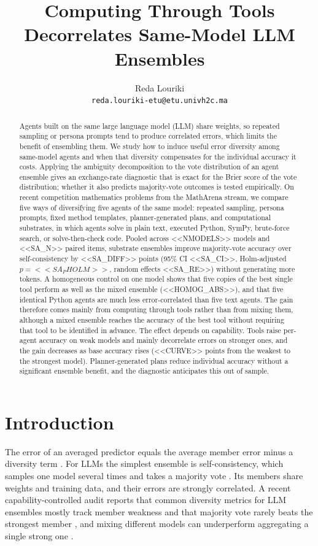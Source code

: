 \documentclass[11pt]{article}
\title{Computing Through Tools Decorrelates Same-Model LLM Ensembles}
\author{Reda Louriki\\\texttt{reda.louriki-etu@etu.univh2c.ma}}
\date{}
\begin{document}
\maketitle

\begin{abstract}
Agents built on the same large language model (LLM) share weights, so repeated sampling or
persona prompts tend to produce correlated errors, which limits the benefit of ensembling them.
We study how to induce useful error diversity among same-model agents and when that diversity
compensates for the individual accuracy it costs. Applying the ambiguity decomposition to the
vote distribution of an agent ensemble gives an exchange-rate diagnostic that is exact for the
Brier score of the vote distribution; whether it also predicts majority-vote outcomes is tested
empirically. On recent competition mathematics problems from the MathArena stream, we compare
five ways of diversifying five agents of the same model: repeated sampling, persona prompts,
fixed method templates, planner-generated plans, and computational substrates, in which agents
solve in plain text, executed Python, SymPy, brute-force search, or solve-then-check code.
Pooled across <<NMODELS>> models and <<SA_N>> paired items, substrate ensembles improve
majority-vote accuracy over self-consistency by <<SA_DIFF>> points (95\% CI <<SA_CI>>,
Holm-adjusted $p=<<SA_PHOLM>>$, random effects <<SA_RE>>) without generating more tokens. A
homogeneous control on one model shows that five copies of the best single tool perform as well
as the mixed ensemble (<<HOMOG_ABS>>), and that five identical Python agents are much less
error-correlated than five text agents. The gain therefore comes mainly from computing through
tools rather than from mixing them, although a mixed ensemble reaches the accuracy of the best
tool without requiring that tool to be identified in advance. The effect depends on capability.
Tools raise per-agent accuracy on weak models and mainly decorrelate errors on stronger ones, and
the gain decreases as base accuracy rises (<<CURVE>> points from the weakest to the strongest
model). Planner-generated plans reduce individual accuracy without a significant ensemble
benefit, and the diagnostic anticipates this out of sample.
\end{abstract}

\section{Introduction}
The error of an averaged predictor equals the average member error minus a diversity term
\citep{krogh1995neural,wood2023unified}. For LLMs the simplest ensemble is self-consistency,
which samples one model several times and takes a majority vote \citep{wang2023selfconsistency}.
Its members share weights and training data, and their errors are strongly correlated. A recent
capability-controlled audit reports that common diversity metrics for LLM ensembles mostly track
member weakness and that majority vote rarely beats the strongest member
\citep{audit2026diversity}, and mixing different models can underperform aggregating a single
strong one \citep{li2025rethinking}.
\end{document}
